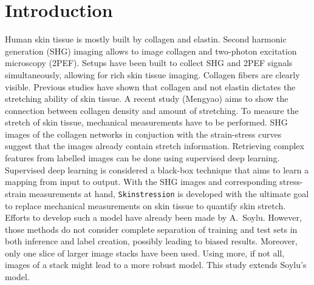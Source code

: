 \chapter{Introduction}

Human skin tissue is mostly built by collagen and elastin.
Second harmonic generation (SHG) imaging allows to image collagen and two-photon excitation microscopy (2PEF).
Setups have been built to collect SHG and 2PEF signals simultaneously, allowing for rich skin tissue imaging.
Collagen fibers are clearly visible.
Previous studies have shown that collagen and not elastin dictates the stretching ability of skin tissue.
A recent study (Mengyao) aims to show the connection between collagen density and amount of stretching.
To measure the stretch of skin tissue, mechanical measurements have to be performed.
SHG images of the collagen networks in conjuction with the strain-stress curves suggest that the images already contain stretch information.
Retrieving complex features from labelled images can be done using supervised deep learning.
Supervised deep learning is considered a black-box technique that aims to learn a mapping from input to output.
With the SHG images and corresponding stress-strain measurements at hand, \texttt{Skinstression} is developed with the ultimate goal to replace mechanical measurements on skin tissue to quantify skin stretch.
Efforts to develop such a model have already been made by A.\ Soylu.
However, those methods do not consider complete separation of training and test sets in both inference and label creation, possibly leading to biased results.
Moreover, only one slice of larger image stacks have been used.
Using more, if not all, images of a stack might lead to a more robust model.
This study extends Soylu's model.
